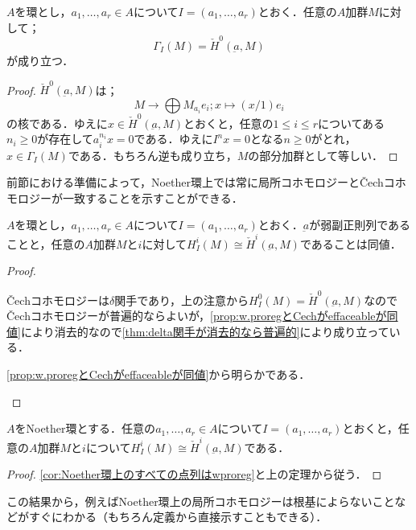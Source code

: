 \begin{lem}
	$A$を環とし，$a_1,\dots,a_r\in A$について$I=(a_1,\dots,a_r)$とおく．任意の$A$加群$M$に対して；
	\[\Gamma_I(M)=\check{H}^0(\underbar{a},M)\]
	が成り立つ．
\end{lem}

\begin{proof}
	$\check{H}^0(\underbar{a},M)$は；
	\[M\to\bigoplus M_{a_i}e_i;x\mapsto(x/1)e_i\]
	の核である．ゆえに$x\in\check{H}^0(\underbar{a},M)$とおくと，任意の$1\leq i\leq r$についてある$n_i\geq 0$が存在して$a_i^{n_i}x=0$である．ゆえに$I^nx=0$となる$n\geq 0$がとれ，$x\in\Gamma_I(M)$である．もちろん逆も成り立ち，$M$の部分加群として等しい．
\end{proof}

前節における準備によって，Noether環上では常に局所コホモロジーと\v{C}echコホモロジーが一致することを示すことができる．

\begin{thm}
$A$を環とし，$a_1,\dots,a_r\in A$について$I=(a_1,\dots,a_r)$とおく．$\underbar{a}$が弱副正則列であることと，任意の$	A$加群$M$と$i$に対して$H_I^i(M)\cong\check{H}^i(\underbar{a},M)$であることは同値．
\end{thm}

\begin{proof}
	\begin{eqv}
		\item \v{C}echコホモロジーは$\delta$関手であり，上の注意から$H_I^0(M)=\check{H}^0(\underbar{a},M)$なので\v{C}echコホモロジーが普遍的ならよいが，\ref{prop:w.proregとCechがeffaceableが同値}により消去的なので\ref{thm:delta関手が消去的なら普遍的}により成り立っている．
		\item \ref{prop:w.proregとCechがeffaceableが同値}から明らかである．
	\end{eqv}
\end{proof}

\begin{cor}\label{cor:Noether環の局所コホモロジーはCech}
	$A$をNoether環とする．任意の$a_1,\dots,a_r\in A$について$I=(a_1,\dots,a_r)$とおくと，任意の$A$加群$M$と$i$について$H^i_I(M)\cong\check{H}^i(\underbar{a},M)$である．
\end{cor}

\begin{proof}
	\ref{cor:Noether環上のすべての点列はwproreg}と上の定理から従う．
\end{proof}

この結果から，例えばNoether環上の局所コホモロジーは根基によらないことなどがすぐにわかる（もちろん定義から直接示すこともできる）．

